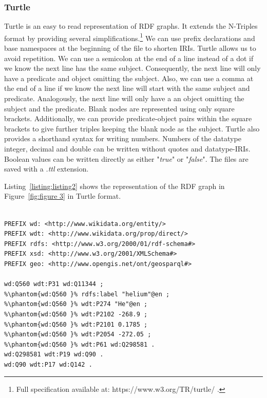 \subsubsection{Turtle}
Turtle is an easy to read representation of RDF graphs. It extends the N-Triples format by providing several simplifications.\footnote{Full specification available at: https://www.w3.org/TR/turtle/ .} We can use prefix declarations and base namespaces at the beginning of the file to shorten IRIs. Turtle allows us to avoid repetition. We can use a semicolon at the end of a line instead of a dot if we know the next line has the same subject. Consequently, the next line will only have a predicate and object omitting the subject. Also, we can use a comma at the end of a line if we know the next line will start with the same subject and predicate. Analogously, the next line will only have a an object omitting the subject and the predicate. Blank nodes are represented using only square brackets. Additionally, we can provide predicate-object pairs within the square brackets to give further triples keeping the blank node as the subject. Turtle also provides a shorthand syntax for writing numbers. Numbers of the datatype integer, decimal and double can be written without quotes and datatype-IRIs. Boolean values can be written directly as either "\textit{true}" or "\textit{false}". The files are saved with a \textit{.ttl} extension.

Listing~\ref{listing:listing2} shows the representation of the RDF graph in Figure~\ref{fig:figure 3} in Turtle format. 

\begin{minipage}{\linewidth}
\begin{lstlisting}[label=listing:listing2, caption={RDF graph represented in Turtle syntax}, language=SPARQL]

PREFIX wd: <http://www.wikidata.org/entity/>
PREFIX wdt: <http://www.wikidata.org/prop/direct/>
PREFIX rdfs: <http://www.w3.org/2000/01/rdf-schema#>
PREFIX xsd: <http://www.w3.org/2001/XMLSchema#>
PREFIX geo: <http://www.opengis.net/ont/geosparql#>

wd:Q560 wdt:P31 wd:Q11344 ;
%\phantom{wd:Q560 }% rdfs:label "helium"@en ;
%\phantom{wd:Q560 }% wdt:P274 "He"@en ;
%\phantom{wd:Q560 }% wdt:P2102 -268.9 ;
%\phantom{wd:Q560 }% wdt:P2101 0.1785 ;
%\phantom{wd:Q560 }% wdt:P2054 -272.05 ;
%\phantom{wd:Q560 }% wdt:P61 wd:Q298581 .
wd:Q298581 wdt:P19 wd:Q90 .
wd:Q90 wdt:P17 wd:Q142 .

\end{lstlisting}
\end{minipage}


